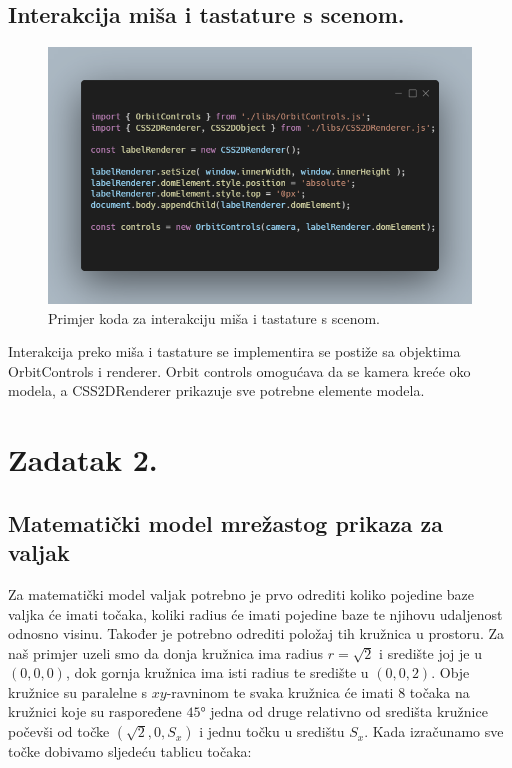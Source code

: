\documentclass[a4paper,12pt]{article}
\begin{document}
\subsection{Interakcija miša i tastature s scenom.}
\begin{figure}[ht]
    \centering
    \includegraphics[scale=0.5]{image/zadatak1_kontrole.png}
    \caption{Primjer koda za interakciju miša i tastature s scenom.}
\end{figure}

Interakcija preko miša i tastature se implementira se postiže sa objektima OrbitControls i renderer. Orbit controls omogućava da se kamera kreće oko modela,
a CSS2DRenderer prikazuje sve potrebne elemente modela.

\pagebreak
\section{Zadatak 2.}

\subsection{Matematički model mrežastog prikaza za valjak}

Za matematički model valjak potrebno je prvo odrediti koliko pojedine baze valjka će imati točaka, koliki radius će imati pojedine baze te njihovu udaljenost odnosno visinu.
Također je potrebno odrediti položaj tih kružnica u prostoru. Za naš primjer uzeli smo da donja kružnica ima radius $r = \sqrt2$ i središte joj je u $(0,0,0)$, dok gornja kružnica ima isti radius te središte u $(0,0,2)$.
Obje kružnice su paralelne s $xy$-ravninom te svaka kružnica će imati 8 točaka na kružnici koje su raspoređene $45$° jedna od druge relativno od središta kružnice počevši od točke $(\sqrt2, 0, S_x)$ i jednu točku u središtu $S_x$.
\newline Kada izračunamo sve točke dobivamo sljedeću tablicu točaka:
\end{document}
